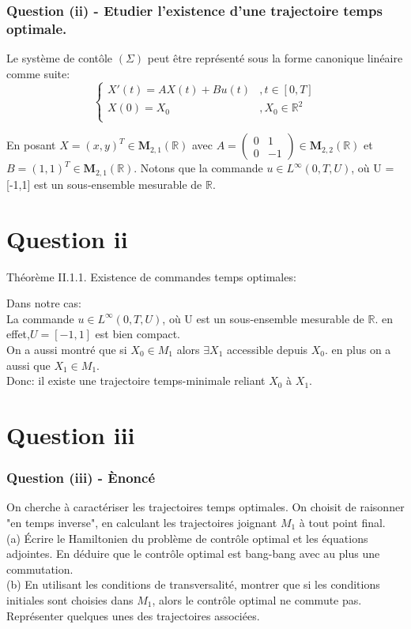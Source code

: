 \documentclass[xcolor=dvipsnames]{beamer}
\newcommand{\mat}[4]{ \begin{pmatrix} #1 & #2 \\ #3 & #4 \end{pmatrix} }
\newcommand{\R}{\mathbb{R}}
\begin{document}
\begin {frame}
\frametitle{Question (ii) -   Etudier l’existence d’une trajectoire temps optimale.}

Le système de contôle $(\Sigma)$ peut être représenté sous la forme canonique linéaire comme suite: $$
\left\lbrace\begin{array}{ll}
X'(t) = AX(t)+Bu(t)& ,t\in [0,T]\\
X(0)=X_0&, X_0\in \R^2\\
\end{array}\right.
$$

En posant $X = (x,y)^T \in \mathbf{M}_{2,1}(\R)$ avec $A=\mat{0}{1}{0}{-1} \in \mathbf{M}_{2,2}(\R)$ et $B=(1,1)^T \in \mathbf{M}_{2,1}(\R)$. Notons que la commande $u \in L^{\infty}(0,T,U)$, où U = [-1,1] est un sous-ensemble mesurable de $\R$.

\end {frame}
\section{Question ii}
\begin{frame}
{Théorème II.1.1. Existence de commandes temps optimales: \\ \color{blue}{On suppose que U est compact. Si le point $x_1$ est accessible depuis $x_0$ avec un contrôle u à valeurs dans U, alors il existe une trajectoire temps-minimale reliant $x_0$ à $x_1$. De plus, $x_1$ est nécessairement extrémal, autrement dit $x_1 \in ∂A(x_0,t^∗)$.}}

{Dans notre cas:}\\

La commande $u \in L^{\infty}(0,T,U)$, où U est un sous-ensemble mesurable de $\R$. en effet,$U =[-1,1]$ est bien compact.\\
On a aussi montré que si $X_0 \in M_1$ alors $\exists X_1$ accessible depuis $X_0$. en plus on a aussi que $X_1 \in M_1$.\\

Donc: il existe une trajectoire temps-minimale reliant $X_0$ à $X_1$.
\end {frame}

\section{Question iii}
\begin{frame}
\frametitle{Question (iii) -   Ènoncé}
On cherche à caractériser les trajectoires temps optimales. On choisit de raisonner
"en temps inverse", en calculant les trajectoires joignant $M_1$ à tout point final.\\

(a) Écrire le Hamiltonien du problème de contrôle optimal et les équations adjointes.
En déduire que le contrôle optimal est bang-bang avec au plus une commutation.\\
(b) En utilisant les conditions de transversalité, montrer que si les conditions initiales sont choisies dans $M_1$, alors le contrôle optimal ne commute pas. Représenter quelques unes des trajectoires associées.
\end {frame}
\end{document}
